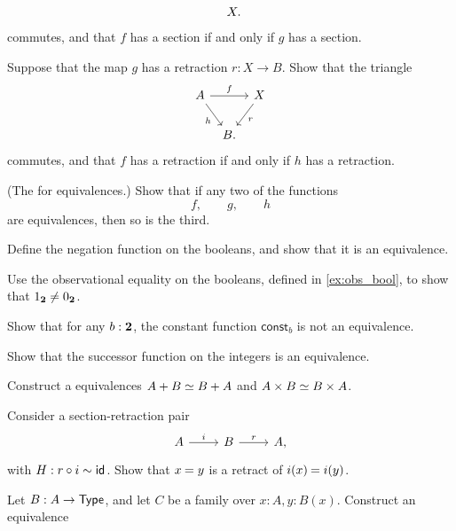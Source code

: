 \begin{exercises}
\begin{subexenum}
\begin{equation*}
\begin{tikzcd}[column sep=tiny]
& X.
\end{tikzcd}
\end{equation*}
commutes, and that $f$ has a section if and only if $g$ has a section.
\item Suppose that the map $g$ has a retraction $r:X\to B$. Show that the triangle
\begin{equation*}
\begin{tikzcd}[column sep=tiny]
A \arrow[rr,"f"] \arrow[dr,swap,"h"] & & X \arrow[dl,"r"] \\
& B.
\end{tikzcd}
\end{equation*}
commutes, and that $f$ has a retraction if and only if $h$ has a retraction.
\item (The  for equivalences.) Show that if any two of the functions
\begin{equation*}
f,\qquad g,\qquad h
\end{equation*}
are equivalences, then so is the third.
\end{subexenum}
\item \label{ex:neg_equiv} 
\begin{subexenum}
\item Define the negation function on the booleans, and show that it is an equivalence.
\item Use the observational equality on the booleans, defined in \cref{ex:obs_bool}, to show that ${1_{\mathbf{2}}}\neq{0_{\ensuremath{\mathbf{2}}}}$.
\item Show that for any $b:\mathbf{2}$, the constant function $\mathsf{const}_b$ is not an equivalence.
\end{subexenum}
\item \label{ex:succ_equiv} Show that the successor function on the integers is an equivalence.
\item \label{ex:comm_prod}Construct a equivalences $\eqv{A+B}{B+A}$ and $\eqv{A\times B}{B\times A}$.
\item \label{ex:retr_id} Consider a section-retraction pair
\begin{equation*}
\begin{tikzcd}
A \arrow[r,"i"] & B \arrow[r,"r"] & A,
\end{tikzcd}
\end{equation*}
with $H:r\circ i\sim \mathsf{id}_{}$. Show that $\id{x}{y}$ is a retract of $\id{i(x)}{i(y)}$.
\item \label{ex:sigma_assoc}Let $B:A\to \mathsf{Type}$, and let $C$ be a family over $x:A,y:B(x)$. Construct an equivalence

\end{exercises}
